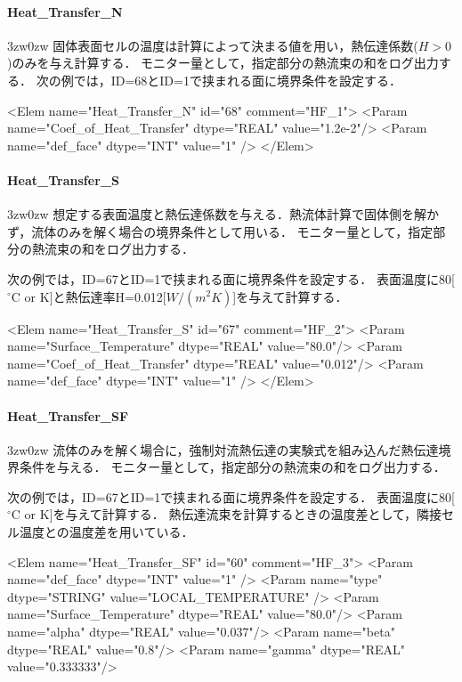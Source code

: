 %
\paragraph{Heat\_Transfer\_N}
\begin{indentation}{3zw}{0zw}
固体表面セルの温度は計算によって決まる値を用い，熱伝達係数($H>0$)のみを与え計算する．
モニター量として，指定部分の熱流束の和をログ出力する．
次の例では，ID=68とID=1で挟まれる面に境界条件を設定する．
{ \small
\begin{program}
<Elem name="Heat_Transfer_N" id="68"  comment="HF_1">
  <Param name="Coef_of_Heat_Transfer" dtype="REAL" value="1.2e-2"/>
  <Param name="def_face"    dtype="INT"    value="1" />
</Elem>
\end{program}
}
\end{indentation}

%
\paragraph{Heat\_Transfer\_S}
\begin{indentation}{3zw}{0zw}
想定する表面温度と熱伝達係数を与える．熱流体計算で固体側を解かず，流体のみを解く場合の境界条件として用いる．
モニター量として，指定部分の熱流束の和をログ出力する．

次の例では，ID=67とID=1で挟まれる面に境界条件を設定する．
表面温度に80[${}^\circ \mathrm{C}$ or K]と熱伝達率H=0.012[$W/(m^2K)$]を与えて計算する．
{ \small
\begin{program}
<Elem name="Heat_Transfer_S" id="67"  comment="HF_2">
  <Param name="Surface_Temperature" dtype="REAL" value="80.0"/>
  <Param name="Coef_of_Heat_Transfer" dtype="REAL" value="0.012"/>
  <Param name="def_face"    dtype="INT"    value="1" />
</Elem>
\end{program}
}
\end{indentation}

%
\paragraph{Heat\_Transfer\_SF}
\begin{indentation}{3zw}{0zw}
流体のみを解く場合に，強制対流熱伝達の実験式を組み込んだ熱伝達境界条件を与える．
モニター量として，指定部分の熱流束の和をログ出力する．

次の例では，ID=67とID=1で挟まれる面に境界条件を設定する．
表面温度に80[${}^\circ \mathrm{C}$ or K]を与えて計算する．
熱伝達流束を計算するときの温度差として，隣接セル温度との温度差を用いている．
{ \small
\begin{program}
<Elem name="Heat_Transfer_SF" id="60"  comment="HF_3">
  <Param name="def_face"    dtype="INT"    value="1" />
  <Param name="type"    dtype="STRING"    value="LOCAL_TEMPERATURE" />
  <Param name="Surface_Temperature" dtype="REAL" value="80.0"/>
  <Param name="alpha" dtype="REAL" value="0.037"/>
  <Param name="beta"  dtype="REAL" value="0.8"/>
  <Param name="gamma" dtype="REAL" value="0.333333"/>
\end{program}
}
\end{indentation}

